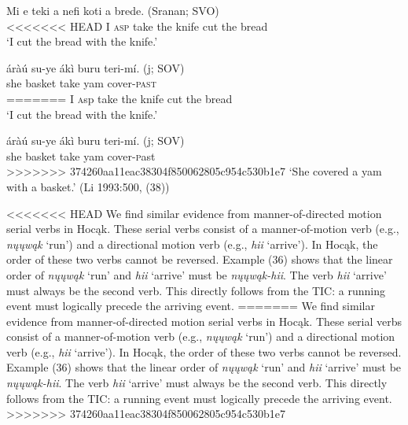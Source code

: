 \documentclass[output=paper]{LSP/langsci}
\begin{document}
\begin{exe}
\begin{exe}
\begin{exe}
\begin{exe}
{\begin{exe}
\begin{exe}
\ex
\begin{xlist}

\ex \gll Mi e teki a nefi koti a brede. \hspace{2cm} (Sranan; SVO)\\
<<<<<<< HEAD
I \textsc{asp} take the knife cut the bread \\
\glt `I cut the bread with the knife.'

\ex \gll \'{a}r\`{a}\'{u} su-ye \'{a}k\`{i} buru teri-m\'{i}. \hspace{2.6cm} (j; SOV)\\
she basket take yam cover-\textsc{past}\\
=======
I {\textsc asp} take the knife cut the bread \\
\glt `I cut the bread with the knife.'

\ex \gll \'{a}r\`{a}\'{u} su-ye \'{a}k\`{i} buru teri-m\'{i}. \hspace{2.6cm} (j; SOV)\\
she basket take yam cover-{\textsc past}\\
>>>>>>> 374260aa11eac38304f850062805c954c530b1e7
\glt `She covered a yam with a basket.' (Li 1993:500, (38))

\end{xlist}
\end{exe}

<<<<<<< HEAD
We find similar evidence from manner-of-directed motion serial verbs in Hocąk. These serial verbs consist of a manner-of-motion verb (e.g., \textit{nųųwąk} `run') and a directional motion verb (e.g., \textit{hii} `arrive'). In Hocąk, the order of these two verbs cannot be reversed. Example (36) shows that the linear order of \textit{nųųwąk} `run' and \textit{hii} `arrive' must be \textit{nųųwąk-hii}. The verb \textit{hii} `arrive' must always be the second verb. This directly follows from the TIC: a running event must logically precede the arriving event.
=======
We find similar evidence from manner-of-directed motion serial verbs in Hoc\k{a}k. These serial verbs consist of a manner-of-motion verb (e.g., \textit{n\k{u}\k{u}w\k{a}k} `run') and a directional motion verb (e.g., \textit{hii} `arrive'). In Hoc\k{a}k, the order of these two verbs cannot be reversed. Example (36) shows that the linear order of \textit{n\k{u}\k{u}w\k{a}k} `run' and \textit{hii} `arrive' must be \textit{n\k{u}\k{u}w\k{a}k-hii}. The verb \textit{hii} `arrive' must always be the second verb. This directly follows from the TIC: a running event must logically precede the arriving event.
>>>>>>> 374260aa11eac38304f850062805c954c530b1e7


\end{exe}}
\end{exe}
\end{exe}
\end{exe}
\end{exe}
\end{document}

